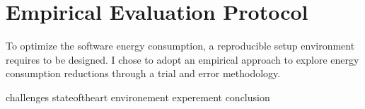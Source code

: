 \newpage

\chapter{Empirical Evaluation Protocol}
\label{chapter:testing}

To optimize the software energy consumption, a reproducible setup environment requires to be designed.
I chose to adopt an empirical approach to explore energy consumption reductions through a trial and error methodology.


{challenges}
{stateoftheart}
{environement}
{experement}
{conclusion}

